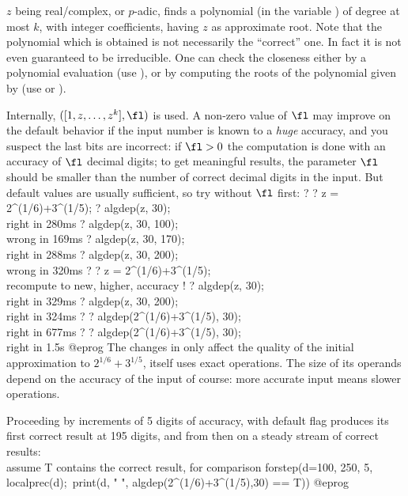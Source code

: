 \label{se:algdep}
$z$ being real/complex, or $p$-adic, finds a polynomial (in the variable
) of degree at most
$k$, with integer coefficients, having $z$ as approximate root. Note that the
polynomial which is obtained is not necessarily the ``correct'' one. In fact
it is not even guaranteed to be irreducible. One can check the closeness
either by a polynomial evaluation (use ), or by computing the
roots of the polynomial given by  (use  or
).

Internally, $([1,z,\ldots,z^k], \fl)$ is used. A non-zero value of
$\fl$ may improve on the default behavior if the input number is known to a
\emph{huge} accuracy, and you suspect the last bits are incorrect: if $\fl > 0$
the computation is done with an accuracy of $\fl$ decimal  digits; to get
meaningful results,  the parameter $\fl$ should be smaller than the number of
correct decimal digits in the input.
But default values are usually sufficient, so try without $\fl$ first:
\bprog
? 
? z = 2^(1/6)+3^(1/5);
? algdep(z, 30);      \\ right in 280ms
? algdep(z, 30, 100); \\ wrong in 169ms
? algdep(z, 30, 170); \\ right in 288ms
? algdep(z, 30, 200); \\ wrong in 320ms
? 
? z = 2^(1/6)+3^(1/5); \\ recompute to new, higher, accuracy !
? algdep(z, 30);      \\ right in 329ms
? algdep(z, 30, 200); \\ right in 324ms
? 
? algdep(2^(1/6)+3^(1/5), 30); \\ right in 677ms
? 
? algdep(2^(1/6)+3^(1/5), 30); \\ right in 1.5s
@eprog\noindent
The changes in  only affect the quality of the
initial approximation to $2^{1/6} + 3^{1/5}$,  itself uses
exact operations. The size of its operands depend on the accuracy of the
input of course: more accurate input means slower operations.

Proceeding by increments of 5 digits of accuracy,  with default
flag produces its first correct result at 195 digits, and from then on a
steady stream of correct results:
\bprog
  \\ assume T contains the correct result, for comparison
  forstep(d=100, 250, 5, localprec(d);\
    print(d, " ", algdep(2^(1/6)+3^(1/5),30) == T))
@eprog


